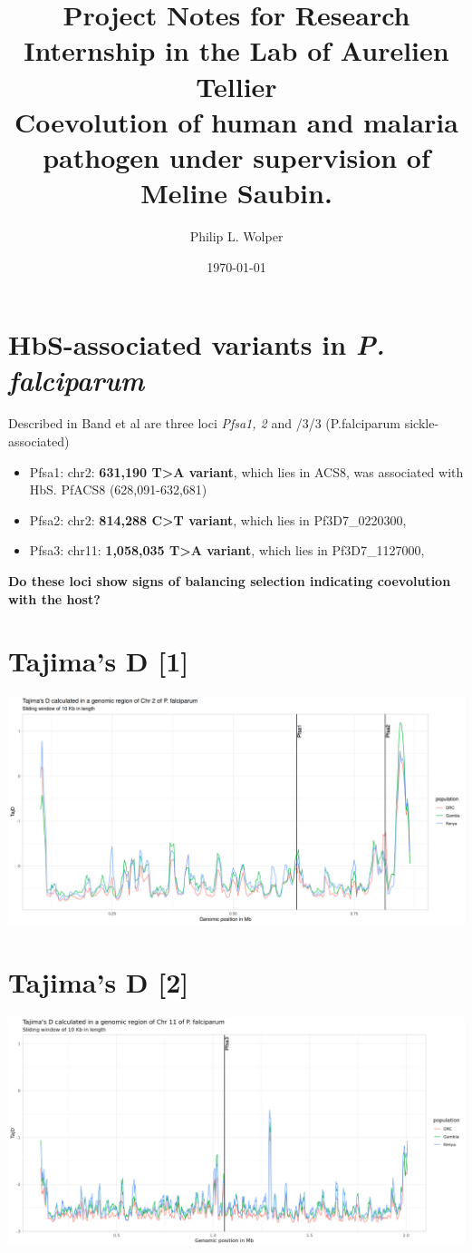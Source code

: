 \documentclass[11pt]{article}
\author{Philip L. Wolper}
\date{\today}
\title{Project Notes for Research Internship in the Lab of Aurelien Tellier\\\medskip
\large Coevolution of human and malaria pathogen under supervision of Meline Saubin.}
\begin{document}
\maketitle


\section{HbS-associated variants in \emph{P. falciparum}}
\label{sec:org7d99933}
Described in Band et al are three loci \emph{Pfsa1, 2} and /3/3 (P.falciparum sickle-associated)

\begin{itemize}
\item Pfsa1: chr2: \textbf{631,190 T>A variant}, which lies in ACS8, was associated with HbS. PfACS8 (628,091-632,681)
\item Pfsa2: chr2: \textbf{814,288 C>T variant}, which lies in Pf3D7\_0220300,
\item Pfsa3: chr11: \textbf{1,058,035 T>A variant}, which lies in Pf3D7\_1127000,
\end{itemize}

\textbf{Do these loci show signs of balancing selection indicating coevolution with the host?}

\section{Tajima's D [1]}
\label{sec:org5204a2b}
\begin{center}
\includegraphics[width=.9\linewidth]{./output/TajD/png/Pf7.chr2.full.TajD_DRC_GM_KE.png}
\end{center}

\section{Tajima's D [2]}
\label{sec:org841cb6f}
\begin{center}
\includegraphics[width=.9\linewidth]{./output/TajD/png/Pf7.chr11.full.TajD_DRC_GM_KE.png}
\end{center}
\end{document}
